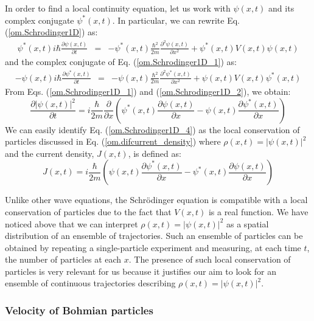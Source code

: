 \documentclass[onecolumn,nofootinbib, secnumarabic, amsmath, nobibnotes,12pt,aps,pra]{revtex4-1}
\newcommand{\eref}[1]{Eq. (\ref{#1})}
\begin{document}
In order to find a local continuity equation, let us work with $\psi(x,t)$ and its complex conjugate $\psi^*(x,t)$. In particular, we can rewrite \eref{om.Schrodinger1D} as:
\begin{eqnarray}
\psi^*(x,t) i \hbar \frac{\partial \psi(x,t)} {\partial t} &=& -\psi^*(x,t)\frac {\hbar^2} {2m} \frac{ {\partial}^2 \psi(x,t)} {\partial x^2}+ \psi^*(x,t) V(x,t) \psi(x,t)
\label{om.Schrodinger1D_1}
\end{eqnarray}
and the complex conjugate of \eref{om.Schrodinger1D_1} as:
\begin{eqnarray}
-\psi(x,t)i \hbar \frac{\partial \psi^*(x,t)} {\partial t} &=& -\psi(x,t)\frac {\hbar^2} {2m} \frac{ {\partial}^2 \psi^*(x,t)} {\partial x^2}+ \psi(x,t)V(x,t) \psi^*(x,t)
\label{om.Schrodinger1D_2}
\end{eqnarray}
From Eqs. (\ref{om.Schrodinger1D_1}) and (\ref{om.Schrodinger1D_2}), we obtain:
\begin{equation}
\label{om.Schrodinger1D_4}
 \frac{\partial |\psi(x,t)|^2} {\partial t} = i\frac {\hbar} {2m} \frac {\partial} {\partial x} \left(\psi^*(x,t) \frac{ {\partial} \psi(x,t)} {\partial x} - \psi(x,t) \frac{ {\partial} \psi^*(x,t)} {\partial x} \right)
\end{equation}
We can easily identify \eref{om.Schrodinger1D_4} as the local conservation of particles discussed in \eref{om.difcurrent_density} where $\rho(x,t) = |\psi(x,t)|^2$ and the current density, $J(x,t)$, is defined as:
\begin{equation}
\label{om.current}
J(x,t) = i \frac {\hbar} {2 m} \left(\psi(x,t) \frac {\partial \psi^{*}(x,t)} {\partial x}- \psi^{*}(x,t) \frac {\partial \psi(x,t)} {\partial x} \right)
\end{equation}

Unlike other  wave equations, the Schr\"odinger equation is compatible
with a local conservation of particles due to the fact that $V(x,t)$
is a real function. We have noticed above that we can interpret
$\rho(x,t) = |\psi(x,t)|^2$ as a spatial distribution of an ensemble
of trajectories. Such an ensemble of particles can be obtained by
repeating a single-particle experiment and measuring, at each time
$t$, the number of particles  at each $x$. The presence of such local
conservation of particles is very relevant for us because it
justifies our aim to look for an ensemble of continuous trajectories
describing $\rho(x,t) = |\psi(x,t)|^2$.

\subsubsection{Velocity of Bohmian particles}
\end{document}

